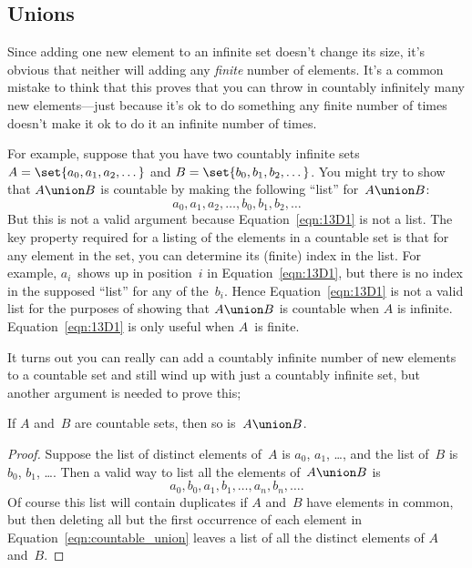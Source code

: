 \subsection{Unions}

Since adding one new element to an infinite set doesn't change its
size, it's obvious that neither will adding any \emph{finite} number
of elements.  It's a common mistake to think that this proves that you
can throw in countably infinitely many new elements---just because
it's ok to do something any finite number of times doesn't make it ok
to do it an infinite number of times.

For example, suppose that you have two countably infinite sets $A =
\set{a_0, a_1, a_2, \dots}$ and $B = \set{b_0, b_1, b_2, \dots}$.  You
might try to show that $A \union B$ is countable by making the
following ``list'' for~$A \union B$:
\begin{equation}\label{eqn:13D1}
    a_0, a_1, a_2, \dots, b_0, b_1, b_2, \dots
\end{equation}
But this is not a valid argument because Equation~\ref{eqn:13D1} is
not a list.  The key property required for a listing of the elements
in a countable set is that for any element in the set, you can
determine its (finite) index in the list.  For example, $a_i$~shows up
in position~$i$ in Equation~\ref{eqn:13D1}, but there is no index in
the supposed ``list'' for any of the~$b_i$.  Hence
Equation~\ref{eqn:13D1} is not a valid list for the purposes  of
showing that $A \union B$ is countable when $A$ is infinite.
Equation~\ref{eqn:13D1} is only useful when $A$~is finite.

It turns out you can really can add a countably infinite number of new
elements to a countable set and still wind up with just a countably
infinite set, but another argument is needed to prove this;

\begin{theorem}\label{thm:countable_union}
If $A$ and~$B$ are countable sets, then so is~$A \union B$.
\end{theorem}

\begin{proof}

Suppose the list of distinct elements of~$A$ is $a_0$, $a_1$, \dots,
and the list of~$B$ is $b_0$, $b_1$, \dots.  Then a valid way to list
all the elements of~$A \union B$ is
\begin{equation}\label{eqn:countable_union}
    a_0, b_0, a_1, b_1, \dots, a_n, b_n, \dots.
\end{equation}
Of course this list will contain duplicates if $A$ and~$B$ have
elements in common, but then deleting all but the first occurrence of
each element in Equation~\ref{eqn:countable_union} leaves a list of
all the distinct elements of $A$ and~$B$.
\end{proof}

